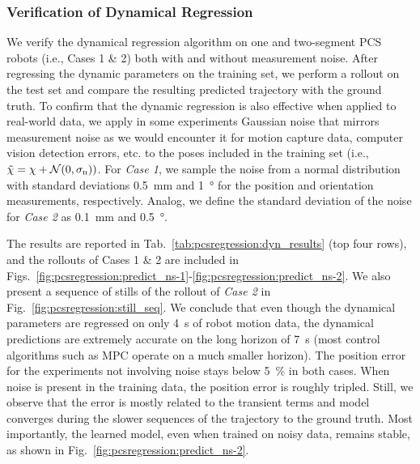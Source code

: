 \subsubsection{Verification of Dynamical Regression}
We verify the dynamical regression algorithm on one and two-segment \gls{PCS} robots (i.e., Cases 1 \& 2) both with and without measurement noise.
After regressing the dynamic parameters on the training set, we perform a rollout on the test set and compare the resulting predicted trajectory with the ground truth.
To confirm that the dynamic regression is also effective when applied to real-world data, we apply in some experiments Gaussian noise that mirrors measurement noise as we would encounter it for motion capture data, computer vision detection errors, etc. to the poses included in the training set (i.e., $\Tilde{\chi} = \chi + \mathcal{N}(0, \sigma_\mathrm{n}))$.
For \emph{Case 1}, we sample the noise from a normal distribution with standard deviations \SI{0.5}{mm} and \SI{1}{\degree} for the position and orientation measurements, respectively.
Analog, we define the standard deviation of the noise for \emph{Case 2} as \SI{0.1}{mm} and \SI{0.5}{\degree}.

The results are reported in Tab.~\ref{tab:pcsregression:dyn_results} (top four rows), and the rollouts of Cases 1 \& 2 are included in Figs.~\ref{fig:pcsregression:predict_ns-1}-\ref{fig:pcsregression:predict_ns-2}. We also present a sequence of stills of the rollout of \emph{Case 2} in Fig.~\ref{fig:pcsregression:still_seq}.
We conclude that even though the dynamical parameters are regressed on only \SI{4}{s} of robot motion data, the dynamical predictions are extremely accurate on the long horizon of \SI{7}{s} (most control algorithms such as \gls{MPC} operate on a much smaller horizon). The position error for the experiments not involving noise stays below \SI{5}{\percent} in both cases.
When noise is present in the training data, the position error is roughly tripled. Still, we observe that the error is mostly related to the transient terms and model converges during the slower sequences of the trajectory to the ground truth. Most importantly, the learned model, even when trained on noisy data, remains stable, as shown in Fig.~\ref{fig:pcsregression:predict_ns-2}.


